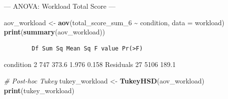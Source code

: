 \documentclass[
]{article}
\newenvironment{Shaded}{\begin{snugshade}}{\end{snugshade}}
\newcommand{\AttributeTok}[1]{\textcolor[rgb]{0.13,0.29,0.53}{#1}}
\newcommand{\CommentTok}[1]{\textcolor[rgb]{0.56,0.35,0.01}{\textit{#1}}}
\newcommand{\FunctionTok}[1]{\textcolor[rgb]{0.13,0.29,0.53}{\textbf{#1}}}
\newcommand{\NormalTok}[1]{#1}
\newcommand{\OtherTok}[1]{\textcolor[rgb]{0.56,0.35,0.01}{#1}}
\newcommand{\SpecialCharTok}[1]{\textcolor[rgb]{0.81,0.36,0.00}{\textbf{#1}}}
\newcommand{\StringTok}[1]{\textcolor[rgb]{0.31,0.60,0.02}{#1}}
\begin{document}
\begin{Shaded}
\end{Shaded}

--- ANOVA: Workload Total Score ---

\begin{Shaded}
\begin{Highlighting}[]
\NormalTok{aov\_workload }\OtherTok{\textless{}{-}} \FunctionTok{aov}\NormalTok{(total\_score\_sum\_6 }\SpecialCharTok{\textasciitilde{}}\NormalTok{ condition, }\AttributeTok{data =}\NormalTok{ workload)}
\FunctionTok{print}\NormalTok{(}\FunctionTok{summary}\NormalTok{(aov\_workload))}
\end{Highlighting}
\end{Shaded}

\begin{verbatim}
        Df Sum Sq Mean Sq F value Pr(>F)
\end{verbatim}

condition 2 747 373.6 1.976 0.158 Residuals 27 5106 189.1

\begin{Shaded}
\begin{Highlighting}[]
\CommentTok{\# Post{-}hoc Tukey}
\NormalTok{tukey\_workload }\OtherTok{\textless{}{-}} \FunctionTok{TukeyHSD}\NormalTok{(aov\_workload)}
\FunctionTok{print}\NormalTok{(tukey\_workload)}
\end{Highlighting}
\end{Shaded}
\end{document}
